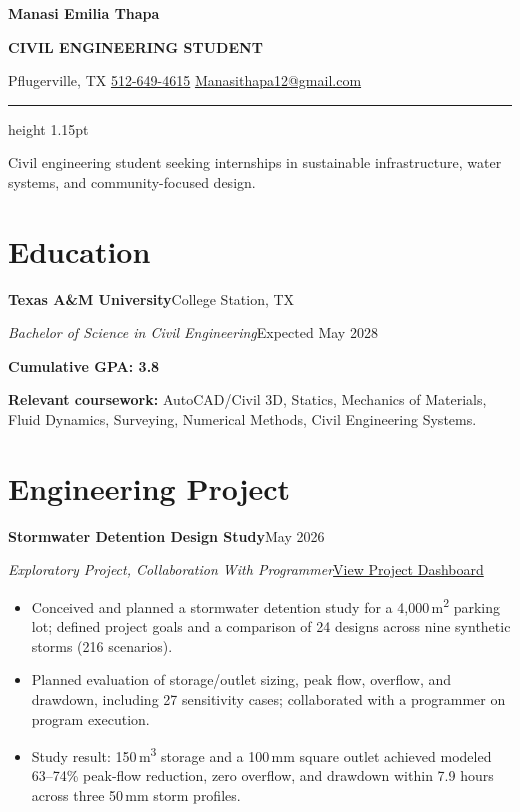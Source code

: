 \documentclass[11pt,letterpaper]{article}
\newcommand{\entry}[4]{%
  \Needspace{5\baselineskip}%
  \textbf{#1}\hfill{\small\color{muted}#2}\par
  {\itshape #3}\hfill{\small\color{muted}#4}\par
}
\newcommand{\contactsep}{\hspace{0.65em}{\color{muted}\textbar}\hspace{0.65em}}
\begin{document}
{\fontsize{29}{33}\selectfont\bfseries\color{accent}Manasi Emilia Thapa}\par
\vspace{3pt}
{\fontsize{11}{13}\selectfont\bfseries\color{muted}CIVIL ENGINEERING STUDENT}\par
\vspace{6pt}
{\small
  Pflugerville, TX\contactsep
  \href{tel:+15126494615}{512-649-4615}\contactsep
  \href{mailto:Manasithapa12@gmail.com}{Manasithapa12@gmail.com}
}\par
\vspace{9pt}
{\color{accent}\hrule height 1.15pt}
\vspace{9pt}

Civil engineering student seeking internships in sustainable infrastructure,
water systems, and community-focused design.

\section{Education}
\entry{Texas A\&M University}{College Station, TX}
      {Bachelor of Science in Civil Engineering}{Expected May 2028}
\vspace{3pt}
\textbf{Cumulative GPA: 3.8}\par
\vspace{4pt}
\textbf{Relevant coursework:} AutoCAD/Civil 3D, Statics, Mechanics of Materials,
Fluid Dynamics, Surveying, Numerical Methods, Civil Engineering Systems.

\section{Engineering Project}
\entry{Stormwater Detention Design Study}{May 2026}
      {Exploratory Project, Collaboration With Programmer}
      {\href{https://manasi-stormwater-study.vercel.app}{\textcolor{accent}{View Project Dashboard}}}
\begin{itemize}
  \item Conceived and planned a stormwater detention study for a 4,000\,m\textsuperscript{2}
        parking lot; defined project goals and a comparison of 24 designs across nine
        synthetic storms (216 scenarios).
  \item Planned evaluation of storage/outlet sizing, peak flow, overflow, and drawdown,
        including 27 sensitivity cases; collaborated with a programmer on program execution.
  \item Study result: 150\,m\textsuperscript{3} storage and a 100\,mm square outlet achieved
        modeled 63--74\% peak-flow reduction, zero overflow, and drawdown within 7.9 hours
        across three 50\,mm storm profiles.
\end{itemize}
\end{document}
